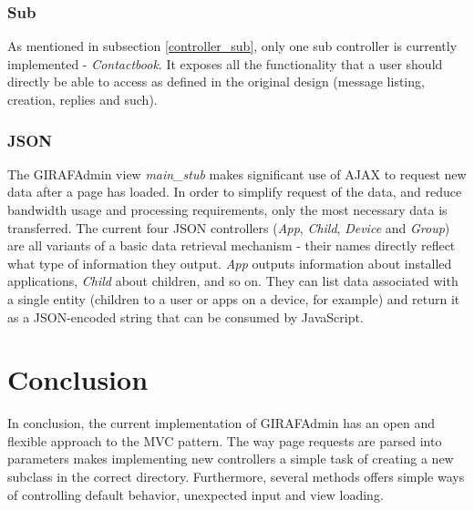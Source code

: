 \subsubsection*{Sub}
As mentioned in subsection \vref{controller_sub}, only one sub controller is currently implemented - \emph{Contactbook}. It exposes all the functionality that a user should directly be able to access as defined in the original design (message listing, creation, replies and such).

\subsubsection*{JSON}
The GIRAFAdmin view \emph{main\_stub} makes significant use of AJAX to request new data after a page has loaded. In order to simplify request of the data, and reduce bandwidth usage and processing requirements, only the most necessary data is transferred. The current four JSON controllers (\emph{App}, \emph{Child}, \emph{Device} and \emph{Group}) are all variants of a basic data retrieval mechanism - their names directly reflect what type of information they output. \emph{App} outputs information about installed applications, \emph{Child} about children, and so on. They can list data associated with a single entity (children to a user or apps on a device, for example) and return it as a JSON-encoded string that can be consumed by JavaScript.

\section{Conclusion}
In conclusion, the current implementation of GIRAFAdmin has an open and flexible approach to the MVC pattern. The way page requests are parsed into parameters makes implementing new controllers a simple task of creating a new subclass in the correct directory. Furthermore, several methods offers simple ways of controlling default behavior, unexpected input and view loading.
